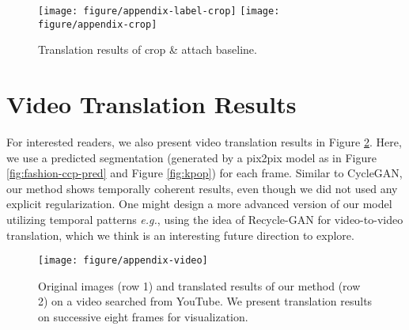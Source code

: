 \documentclass{article} \usepackage{iclr2019_conference,times}
\begin{document}
\begin{figure}[H]
	\centering
	\texttt{[image: figure/appendix-label-crop]}
	\texttt{[image: figure/appendix-crop]}
\caption{
	Translation results of crop \& attach baseline.
	} \label{fig:crop-and-attach}
\end{figure}


\newpage
\section{Video Translation Results}

For interested readers, we also present video translation results in Figure \ref{fig:video}.
Here, we use a predicted segmentation (generated by a pix2pix \citep{isola2017image} model as in
Figure \ref{fig:fashion-ccp-pred} and Figure \ref{fig:kpop}) for each frame.
Similar to CycleGAN, our method shows temporally coherent results, even though we did not used any explicit regularization.
One might design a more advanced version of our model utilizing temporal patterns
\textit{e.g.}, using the idea of Recycle-GAN \citep{bansal2018recycle} for video-to-video translation,
which we think is an interesting future direction to explore.

\begin{figure}[H]
	\centering
	\texttt{[image: figure/appendix-video]}
	\caption{
	Original images (row 1) and translated results of our method (row 2) on a video searched from YouTube.
	We present translation results on successive eight frames for visualization.
	} \label{fig:video}
\end{figure}

\iffalse
\section{More Translation Results}

We report additional translation results for zebra$\leftrightarrow$elephant, bird$\leftrightarrow$zebra, and car$\leftrightarrow$horse tasks.
For the case of zebra$\leftrightarrow$elephant (which is the easiest translation task among three),
both CycleGAN and our method succeed to translate images, but ours shows better details.
For example, our method expand the body of zebras (see row 1 of Figure \ref{fig:more-tasks-1})
or generated long noses (see row 2 of Figure \ref{fig:more-tasks-1}) for zebra$\to$elephant task,
and produces thinner body and neck (see Figure \ref{fig:more-tasks-2}) for elephant$\to$zebra task.
For other cases of bird$\leftrightarrow$zebra and car$\leftrightarrow$horse,
our method succeeds to translate, while CycleGAN fails,
\textit{i.e.}, generates target textures in random location (see Figure \ref{fig:more-tasks-3}),
remove instances (see Figure \ref{fig:more-tasks-4})
or learns an identity mapping (see Figure \ref{fig:more-tasks-5} and Figure \ref{fig:more-tasks-6}).
\fi
\end{document}

